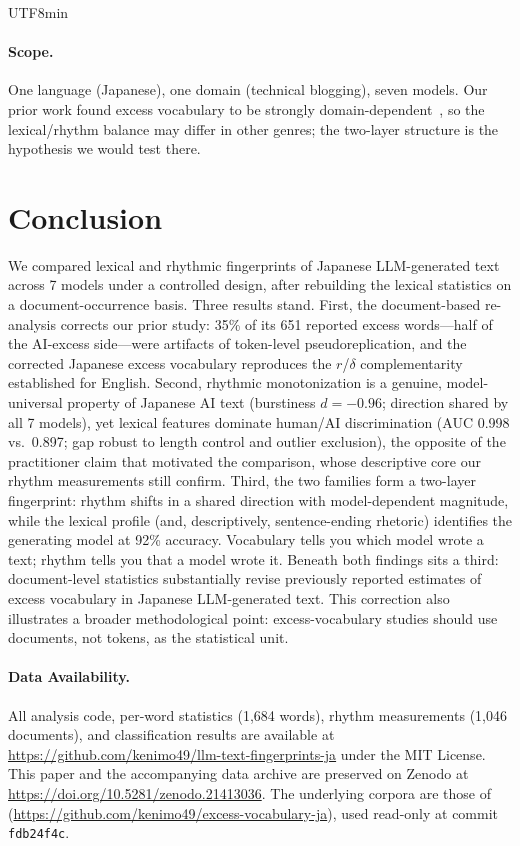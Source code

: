\documentclass[11pt,a4paper]{article}
\begin{document}
\begin{CJK}{UTF8}{min}
\paragraph{Scope.} One language (Japanese), one domain (technical blogging), seven models. Our prior work found excess vocabulary to be strongly domain-dependent~\citep{imoto2026excess}, so the lexical/rhythm balance may differ in other genres; the two-layer structure is the hypothesis we would test there.

\section{Conclusion}

We compared lexical and rhythmic fingerprints of Japanese LLM-generated text across 7 models under a controlled design, after rebuilding the lexical statistics on a document-occurrence basis. Three results stand. First, the document-based re-analysis corrects our prior study: 35\% of its 651 reported excess words---half of the AI-excess side---were artifacts of token-level pseudoreplication, and the corrected Japanese excess vocabulary reproduces the $r$/$\delta$ complementarity established for English. Second, rhythmic monotonization is a genuine, model-universal property of Japanese AI text (burstiness $d=-0.96$; direction shared by all 7 models), yet lexical features dominate human/AI discrimination (AUC 0.998 vs.\ 0.897; gap robust to length control and outlier exclusion), the opposite of the practitioner claim that motivated the comparison, whose descriptive core our rhythm measurements still confirm. Third, the two families form a two-layer fingerprint: rhythm shifts in a shared direction with model-dependent magnitude, while the lexical profile (and, descriptively, sentence-ending rhetoric) identifies the generating model at 92\% accuracy. Vocabulary tells you which model wrote a text; rhythm tells you that a model wrote it. Beneath both findings sits a third: document-level statistics substantially revise previously reported estimates of excess vocabulary in Japanese LLM-generated text. This correction also illustrates a broader methodological point: excess-vocabulary studies should use documents, not tokens, as the statistical unit.

\paragraph{Data Availability.}
\sloppy
All analysis code, per-word statistics (1{,}684 words), rhythm measurements (1{,}046 documents), and classification results are available at \url{https://github.com/kenimo49/llm-text-fingerprints-ja} under the MIT License. This paper and the accompanying data archive are preserved on Zenodo at \url{https://doi.org/10.5281/zenodo.21413036}.
The underlying corpora are those of \citet{imoto2026excess} (\url{https://github.com/kenimo49/excess-vocabulary-ja}), used read-only at commit \texttt{fdb24f4c}.



\end{CJK}
\end{document}
